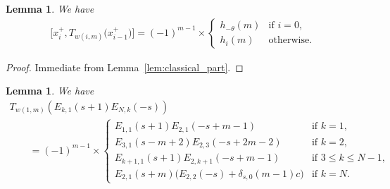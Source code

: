 \documentclass[pdftex]{sigma}
\newtheorem{lem}[thm]{Lemma}
\theoremstyle{definition}
\numberwithin{equation}{section}
\begin{document}
\begin{lem}\label{lem:braket_pre}
We have
\begin{gather*} \big[x_{i}^+, T_{w(i,m)}\big(x_{i-1}^+\big)\big] = (-1)^{m-1} \times \begin{cases}
h_{-\theta}(m) & \text{if $i=0$},\\
h_i(m) & \text{otherwise}.
\end{cases}
\end{gather*}
\end{lem}

\begin{proof}
Immediate from Lemma~\ref{lem:classical_part}.
\end{proof}

\begin{lem}\label{lem:i=1}We have
\begin{gather*}
T_{w(1,m)}(E_{k,1}(s+1)E_{N,k}(-s)) \\
\qquad{} = (-1)^{m-1} \times\begin{cases}
E_{1,1}(s+1)E_{2,1}(-s+m-1) & \text{if $k=1$},\\
E_{3,1}(s-m+2)E_{2,3}(-s+2m-2) & \text{if $k=2$},\\
E_{k+1,1}(s+1)E_{2,k+1}(-s+m-1) & \text{if $3 \leq k \leq N-1$},\\
E_{2,1}(s+m)\Big( E_{2,2}(-s) + \delta_{s,0}(m-1)c \Big) & \text{if $k=N$}.
\end{cases}
\end{gather*}
\end{lem}
\end{document}
